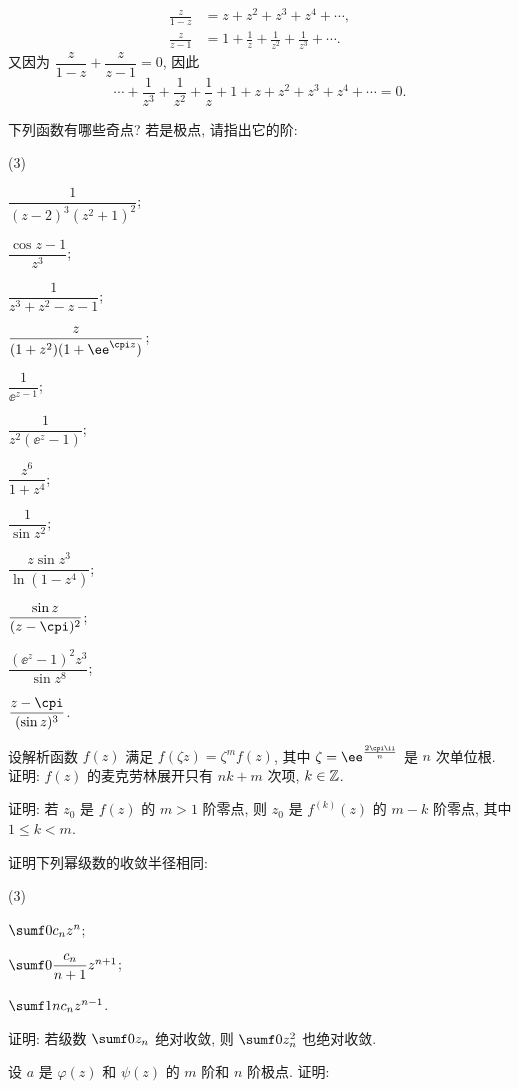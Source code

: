 \begin{homework}
\begin{homework}
      \begin{align*}
        \frac{z}{1-z}&=z+z^2+z^3+z^4+\cdots,\\
        \frac{z}{z-1}&=1+\frac1z+\frac1{z^2}+\frac1{z^3}+\cdots.
      \end{align*}
      又因为 $\dfrac{z}{1-z}+\dfrac{z}{z-1}=0$, 因此
      \[
        \cdots+\frac1{z^3}+\frac1{z^2}+\frac1z+1+z+z^2+z^3+z^4+\cdots=0.
      \]
    \item 下列函数有哪些奇点? 若是极点, 请指出它的阶:
      \begin{subhomework}(3)
        \item $\dfrac1{(z-2)^3(z^2+1)^2}$;
        \item $\dfrac{\cos z-1}{z^3}$;
        \item $\dfrac1{z^3+z^2-z-1}$;
        \item $\dfrac z{(1+z^2)(1+\ee^{\cpi z})}$;
        \item $\dfrac1{\ee^{z-1}}$;
        \item $\dfrac1{z^2(\ee^z-1)}$;
        \item $\dfrac{z^6}{1+z^4}$;
        \item $\dfrac1{\sin z^2}$;
        \item $\dfrac{z\sin z^3}{\ln(1-z^4)}$;
        \item $\dfrac{\sin z}{(z-\cpi)^2}$;
        \item $\dfrac{(\ee^z-1)^2z^3}{\sin z^8}$;
        \item $\dfrac{z-\cpi}{(\sin z)^3}$.
      \end{subhomework}
    \item 设解析函数 $f(z)$ 满足 $f(\zeta z)=\zeta^m f(z)$, 其中 $\zeta=\ee^{\frac{2\cpi\ii}n}$ 是 $n$ 次单位根.
      证明: $f(z)$ 的麦克劳林展开只有 $nk+m$ 次项, $k\in{\mathbb{Z}}$.
    \item 证明: 若 $z_0$ 是 $f(z)$ 的 $m>1$ 阶零点, 则 $z_0$ 是 $f^{(k)}(z)$ 的 $m-k$ 阶零点, 其中 $1\le k<m$.
    \item 证明下列幂级数的收敛半径相同:
      \begin{subhomework}(3)
        \item $\sumf0 c_nz^n$;
        \item $\sumf0 \dfrac{c_n}{n+1}z^{n+1}$;
        \item $\sumf1 nc_nz^{n-1}$.
      \end{subhomework}
    \item 证明: 若级数 $\sumf0 z_n$ 绝对收敛, 则 $\sumf0 z_n^2$ 也绝对收敛.
    \item 设 $a$ 是 $\varphi(z)$ 和 $\psi(z)$ 的 $m$ 阶和 $n$ 阶极点. 证明:

\end{homework}
\end{homework}
